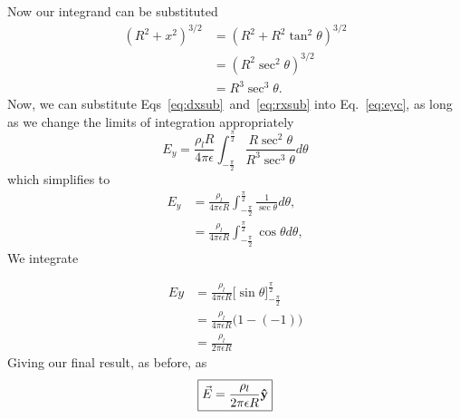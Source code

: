 \documentclass{tufte-handout}
\newcommand{\uvec}[1]{{\bm{\hat{\textnormal{\bfseries #1}}}}}
\begin{document}
Now our integrand can be substituted
\begin{align}
(R^2 + x^2)^{3/2} & = (R^2 +  R^2\tan^2\theta)^{3/2} \\
& = (R^2\sec^2\theta)^{3/2}\\
& = R^3\sec^3\theta \label{eq:rxsub}.
\end{align}
Now, we can substitute Eqs~\ref{eq:dxsub}~and~\ref{eq:rxsub} into Eq.~\ref{eq:eyc}, as long as we change the limits of integration appropriately
\begin{equation}
E_y = \frac{\rho_lR}{4\pi\epsilon{}} \int_{-\frac{\pi}{2}}^{\frac{\pi}{2}}\frac{ R\sec^2\theta }{R^3\sec^3\theta}d\theta
\end{equation}
which simplifies to
\begin{align}
E_y & = \frac{\rho_l}{4\pi\epsilon{}R} \int_{-\frac{\pi}{2}}^{\frac{\pi}{2}}\frac{1}{\sec\theta}d\theta,\\
 & =\frac{\rho_l}{4\pi\epsilon{}R} \int_{-\frac{\pi}{2}}^{\frac{\pi}{2}} \cos\theta d\theta,
\end{align}
We integrate
\begin{marginfigure}

\end{marginfigure}
\begin{align}
Ey & =\frac{\rho_l}{4\pi\epsilon{}R} \Big[ \sin\theta \Big]_{-\frac{\pi}{2}}^{\frac{\pi}{2}} \\
& = \frac{\rho_l}{4\pi\epsilon{}R} \big(1 - (-1) \big) \\
& = \frac{\rho_l}{2\pi\epsilon{}R} 
\end{align}
Giving our final result, as before, as
\begin{equation*}
\boxed{\vec{E} = \frac{\rho_l}{2\pi\epsilon{}R}\uvec{y}}
\end{equation*}
\end{document}
